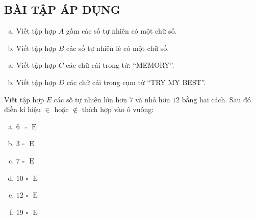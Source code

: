 \subsection{BÀI TẬP ÁP DỤNG}
\begin{bt}
	\begin{enumerate}[a)]
\item Viết tập hợp $A$ gồm các số tự nhiên có một chữ số.
\item Viết tập hợp $B$ các số tự nhiên lẻ có một chữ số.
\end{enumerate}
\end{bt}
\begin{bt}
\begin{enumerate}[a)]
\item Viết tập hợp $C$ các chữ cái trong từ: “MEMORY”.
\item Viết tập hợp $D$ các chữ cái trong cụm từ “TRY MY BEST”.
\end{enumerate}
\end{bt} 
\begin{bt}
Viết tập hợp $E$ các số tự nhiên lớn hơn $7$ và nhỏ hơn $12$ bằng hai cách. Sau đó điền kí hiệu $\in$ hoặc $\notin$ thích hợp vào ô vuông:
\begin{multicols}{2}
\begin{enumerate}[a)]
\item $6\text{ }\square\text{ }\mathrm{E}$
\item $\text{3 }\square\text{ }\mathrm{E}$
\item $\text{7 }\square\text{ }\mathrm{E}$
\item $\text{10 }\square\text{ }\mathrm{E}$
\item $\text{12 }\square\text{ }\mathrm{E}$
\item $\text{19 }\square\text{ }\mathrm{E}$
\end{enumerate}
\end{multicols}
\end{bt} 
